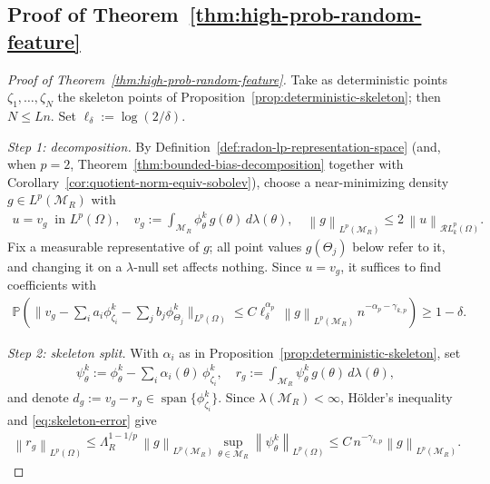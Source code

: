 \documentclass[12pt]{article}
\numberwithin{equation}{section}
\numberwithin{figure}{section}
\numberwithin{equation}{section}
\newcommand{\MR}{\mathcal M_R}
\newcommand{\norm}[1]{\left\|#1\right\|}
\DeclareMathOperator{\spanop}{span}
\begin{document}
\subsection{Proof of Theorem~\ref{thm:high-prob-random-feature}}

\begin{proof}[Proof of Theorem~\ref{thm:high-prob-random-feature}]
Take as deterministic points $\zeta_1,\dots,\zeta_N$ the skeleton points of
Proposition~\ref{prop:deterministic-skeleton}; then $N\le Ln$. Set
$\ell_\delta:=\log(2/\delta)$.

\emph{Step 1: decomposition.} By Definition~\ref{def:radon-lp-representation-space}
(and, when $p=2$, Theorem~\ref{thm:bounded-bias-decomposition} together with
Corollary~\ref{cor:quotient-norm-equiv-sobolev}), choose a near-minimizing density
$g\in L^p(\MR)$ with
\begin{align*}
    u=v_g\ \text{ in }L^p(\Omega),
    \quad
    v_g:=\int_{\MR}\phi^k_\theta\,g(\theta)\,d\lambda(\theta),
    \quad
    \norm{g}_{L^p(\MR)}\le2\,\norm{u}_{\mathcal{R}L^p_k(\Omega)}.
\end{align*}
Fix a measurable representative of $g$; all point values $g(\Theta_j)$ below refer
to it, and changing it on a $\lambda$-null set affects nothing. Since $u=v_g$, it
suffices to find coefficients with
\begin{align}
    \mathbb P\left(
    \Big\|v_g-\sum_i a_i\phi^k_{\zeta_i}-\sum_j b_j\phi^k_{\Theta_j}\Big\|_{L^p(\Omega)}
    \le C\ell_\delta^{\alpha_p}\,\norm{g}_{L^p(\MR)}\,n^{-\alpha_p-\gamma_{k,p}}
    \right)\ge1-\delta.
    \label{eq:vg-target-lp}
\end{align}

\emph{Step 2: skeleton split.} With $\alpha_i$ as in
Proposition~\ref{prop:deterministic-skeleton}, set
\begin{align*}
    \psi^k_\theta:=\phi^k_\theta-\sum_i\alpha_i(\theta)\,\phi^k_{\zeta_i},
    \quad
    r_g:=\int_{\MR}\psi^k_\theta\,g(\theta)\,d\lambda(\theta),
\end{align*}
and denote $d_g:=v_g-r_g \in\spanop\{\phi^k_{\zeta_i}\}$. Since 
$\lambda(\MR)<\infty$, H\"older's inequality and \eqref{eq:skeleton-error} give
\begin{align}
    \norm{r_g}_{L^p(\Omega)}
    \le\Lambda_R^{1-1/p}\,\norm{g}_{L^p(\MR)}\sup_{\theta\in\MR}\norm{\psi^k_\theta}_{L^p(\Omega)}
    \le C\,n^{-\gamma_{k,p}}\norm{g}_{L^p(\MR)}.
    \label{eq:rg-deterministic-lp}
\end{align}


\end{proof}
\end{document}
